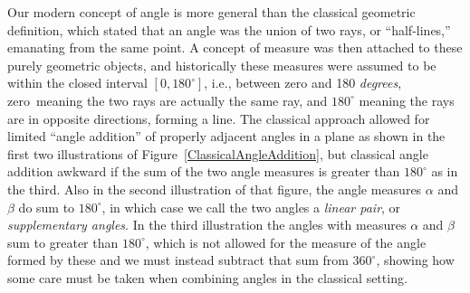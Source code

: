Our modern concept of angle is more general than the classical
geometric definition, which stated that an angle was the union
of two rays, or ``half-lines,'' emanating from the same point.\footnotemark
{}
A concept of measure was then attached to these purely geometric
objects, and historically these measures were assumed to 
be within the closed interval $[0,180^\circ]$, i.e., 
between zero and 180 {\it degrees}, zero\footnotemark\ 
 meaning the two
rays are actually the same ray, and $180^\circ$ meaning
the rays are in opposite directions, forming a line.
The classical approach allowed for limited
``angle addition'' of properly adjacent angles in a plane
 as shown in the first two illustrations of 
Figure~\ref{ClassicalAngleAddition}, 
but classical angle addition
 awkward if the sum of the two angle measures is greater than
 $180^\circ$ as in the third.  Also in the second illustration
of that figure, the angle measures $\alpha$ and $\beta$ do 
sum to $180^\circ$, in which case we call the two angles a
{\it linear pair}, or {\it supplementary angles}.  In the
third illustration the angles with measures $\alpha$ and $\beta$
sum to greater than $180^\circ$, which is not allowed for the
measure of the angle formed by these and we must instead subtract
that sum from $360^\circ$, showing how some care must
be taken when combining angles in the classical setting.
